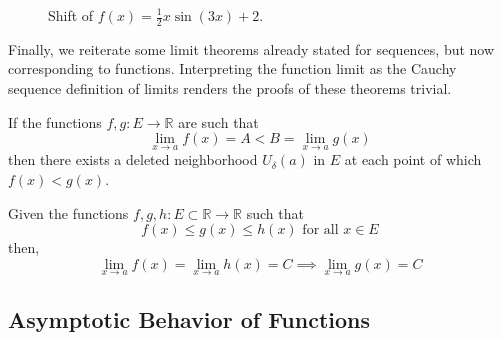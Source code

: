 \begin{theorem}
\begin{figure}[H]
      \caption{Shift of $f(x) = \frac{1}{2} x \sin(3x) + 2$.} 
      \label{fig:infinitesimal_shift_function}
    \end{figure}
  \end{theorem}

  Finally, we reiterate some limit theorems already stated for sequences, but now corresponding to functions. Interpreting the function limit as the Cauchy sequence definition of limits renders the proofs of these theorems trivial. 

  \begin{theorem}
    If the functions $f, g: E \rightarrow \mathbb{R}$ are such that
    \begin{equation}
      \lim_{x\rightarrow a} f(x) = A < B = \lim_{x \rightarrow a} g(x)
    \end{equation}
    then there exists a deleted neighborhood $U_\delta (a)$ in $E$ at each point of which $f(x) < g(x)$. 
  \end{theorem}

  \begin{theorem}
    Given the functions $f, g, h: E \subset \mathbb{R} \longrightarrow \mathbb{R}$ such that
    \begin{equation}
      f(x) \leq g(x) \leq h(x) \text{ for all } x \in E
    \end{equation}
    then, 
    \begin{equation}
      \lim_{x \rightarrow a} f(x) = \lim_{x \rightarrow a} h(x) = C \implies \lim_{x \rightarrow a} g(x) = C
    \end{equation}
  \end{theorem}

\subsection{Asymptotic Behavior of Functions}

